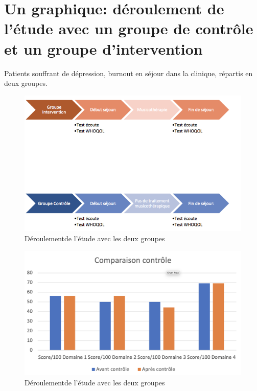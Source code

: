  
     
          
 
 
 	
 	
       

 	
 	\section{Un graphique: déroulement de l'étude avec un groupe
          de contrôle et un groupe d'intervention}





                                      Patients souffrant de dépression, burnout
                                               en séjour dans la
                                               clinique, répartis en
                                               deux groupes.
                                             

\begin{figure}
\centering
\includegraphics[width=0.7\linewidth]{images/Groupecontrole.png}
\caption[Schéma du déroulement]{Déroulementde l'étude avec les
         deux groupes}
       
\label{groupecontroleimage1}
\end{figure}

\begin{figure}
\centering
\includegraphics[width=0.7\linewidth]{images/Compcontrole.png}
\caption[Schéma du déroulement]{Déroulementde l'étude avec les
         deux groupes}
       
\label{groupecontroleimage1}
\end{figure}

